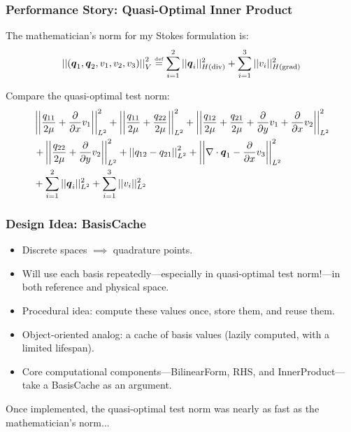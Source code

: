 \documentclass[mathserif]{beamer}
\newcommand{\NVRvect}[1]{\ensuremath\boldsymbol{#1}}
\newcommand{\NVRnorm}[1]{\left|\left|#1\right|\right|}
\newcommand{\NVRgrad}{\nabla}
\newcommand{\NVRdiv}{\NVRgrad \cdot}
\newcommand{\NVRpd}[2]{\frac{\partial#1}{\partial#2}}
\newcommand{\NVReqdef}{\stackrel{\text{\tiny def}}{=}}
\newcommand{\NVRHgrad}{H(\text{grad})}
\newcommand{\NVRHdiv}{H(\text{div})}
\newcommand{\NVRsumm}[2]{\ensuremath\displaystyle\sum\limits_{#1}^{#2}}
\begin{document}
\begin{frame}
\frametitle{Performance Story: Quasi-Optimal Inner Product}

The mathematician's norm for my Stokes formulation is:
\begin{align*}
\NVRnorm{(\NVRvect{q}_{1},\NVRvect{q}_{2},v_{1},v_{2},v_{3})}_{V}^{2}  \NVReqdef \NVRsumm{i=1}{2} ||\NVRvect{q}_{i}||_{\NVRHdiv}^{2} + \NVRsumm{i=1}{3} ||v_{i}||_{\NVRHgrad}^{2} \label{NVR:eq:genericNorm}\\
\end{align*}

Compare the quasi-optimal test norm:
\begin{align*}
& \NVRnorm{\frac{q_{11}}{2\mu}+\NVRpd{}{x}v_{1}}_{L^2}^{2} + \NVRnorm{\frac{q_{11}}{2\mu}+\frac{q_{22}}{2\mu}}_{L^2}^{2} + \NVRnorm{\frac{q_{12}}{2\mu}+\frac{q_{21}}{2\mu}+\NVRpd{}{y}v_{1}+\NVRpd{}{x}v_{2}}_{L^2}^{2}\\
&\left. + \NVRnorm{\frac{q_{22}}{2\mu}+\NVRpd{}{y}v_{2}}_{L^2}^{2} + \NVRnorm{q_{12}-q_{21}}_{L^2}^{2} + \NVRnorm{\NVRdiv \NVRvect{q}_{1}-\NVRpd{}{x}v_{3}}_{L^2}^{2} \right.\\
&+\NVRsumm{i=1}{2} ||\NVRvect{q}_{i}||_{L^{2}}^{2} + \NVRsumm{i=1}{3} ||v_{i}||_{L^{2}}^{2}\\
\end{align*}

\end{frame}


\begin{frame}
\frametitle{Design Idea: BasisCache}

\begin{itemize}
\item Discrete spaces $\implies$ quadrature points.
\item Will use each basis repeatedly---especially in quasi-optimal test norm!---in both reference and physical space.
\end{itemize}

\begin{itemize}
\item Procedural idea: compute these values once, store them, and reuse them.
\item Object-oriented analog: a cache of basis values (lazily computed, with a limited lifespan).
\item Core computational components---BilinearForm, RHS, and InnerProduct---take a BasisCache as an argument.
\end{itemize}

Once implemented, the quasi-optimal test norm was nearly as fast as the mathematician's norm...

\end{frame}
\end{document}
